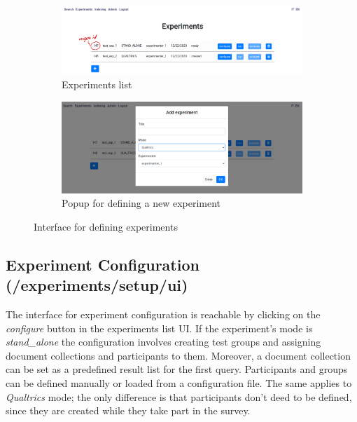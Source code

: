 \documentclass[a4paper]{usiinfbachelorproject}
\begin{document}
\begin{appendices}
        \begin{figure} [h]
             \centering
             \begin{subfigure}[b]{0.8\textwidth}
                 \centering
                 \includegraphics[width=\textwidth]{figures/experiments_1}
                 \caption{Experiments list}
                 \label{fig:experimentsUi1}
             \end{subfigure}
             \par\bigskip
             \begin{subfigure}[b]{0.8\textwidth}
                 \centering
                 \includegraphics[width=\textwidth]{figures/experiments_2}
                 \caption{Popup for defining a new experiment}
                 \label{fig:experimentsUi2}
             \end{subfigure}
             \caption[]{Interface for defining experiments}
             \label{fig:experimentsUi}
        \end{figure}


        \subsection{Experiment Configuration \small{(/experiments/setup/ui)}}

        The interface for experiment configuration is reachable by clicking on the \emph{configure} button in the
        experiments list UI. If the experiment's mode is \emph{stand\_alone} the configuration involves creating test groups and assigning 
        document collections and participants to them. Moreover, a document collection can be set as a predefined result list for the first query.
        Participants and groups can be defined manually or loaded from a configuration file. The same applies to \emph{Qualtrics} mode; the only difference is that 
        participants don't deed to be defined, since they are created while
        they take part in the survey.


\end{appendices}
\end{document}
